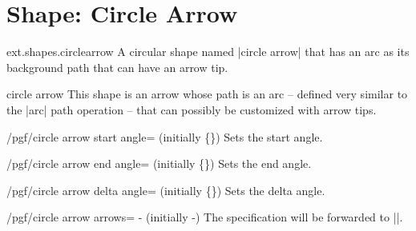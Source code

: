 %
%
%
\section{Shape: Circle Arrow}
\begin{pgflibrary}{ext.shapes.circlearrow}
  A circular shape named |circle arrow| that has an arc as its background path that can have an arrow tip.
\end{pgflibrary}
\begin{shape}{circle arrow}
  This shape is an arrow whose path is an arc -- defined very similar to the |arc|%
   path operation -- that can possibly be customized with
  arrow tips.
  
  \begin{key}{/pgf/circle arrow start angle= (initially \{\})}
  Sets the start angle.
  \end{key}
  \begin{key}{/pgf/circle arrow end angle= (initially \{\})}
  Sets the end angle.
  \end{key}
  \begin{key}{/pgf/circle arrow delta angle= (initially \{\})}
  Sets the delta angle.
  \end{key}
  \begin{key}{/pgf/circle arrow arrows=%
    - (initially -)}
  The specification will be forwarded to |\pgfsetarrows|\indexCommandO{\pgfsetarrows}.
  \end{key}
  

\end{shape}
